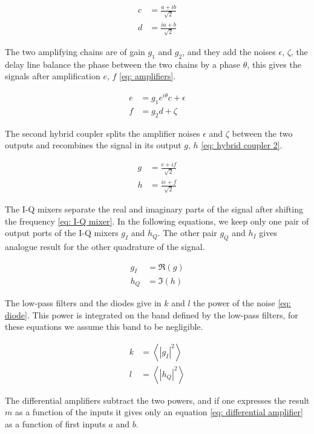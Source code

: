 \begin{align}
	c & =  \frac{a+ib}{\sqrt{2}} \\
	d & =  \frac{ia+b}{\sqrt{2}} \label{eq: hybrid coupler 1}
\end{align}

The two amplifying chains are of gain $g_{1}$ and $g_{2}$, and they add the noises $\epsilon$, $\zeta$, the delay line balance the phase between the two chains by a phase $\theta$, this gives the signals after amplification $e$, $f$ \eqref{eq: amplifiers}.

\begin{align}
	e & =  g_{1}e^{i\theta}c+\epsilon \\
	f & =  g_{2}d+\zeta \label{eq: amplifiers}
\end{align}

The second hybrid coupler splits the amplifier noises $\epsilon$ and $\zeta$ between the two outputs and recombines the signal in its output $g$, $h$ \eqref{eq: hybrid coupler 2}.

\begin{align}
	g & =  \frac{e+if}{\sqrt{2}} \\
	h & =  \frac{ie+f}{\sqrt{2}} \label{eq: hybrid coupler 2}
\end{align}

The I-Q mixers separate the real and imaginary parts of the signal after shifting the frequency \eqref{eq: I-Q mixer}.
In the following equations, we keep only one pair of output ports of the I-Q mixers $g_{I}$ and $h_{Q}$.
The other pair $g_{Q}$ and $h_{I}$ gives analogue result for the other quadrature of the signal.

\begin{align}
	g_{I} & = \Re\left(g\right) \\
	h_{Q} & = \Im\left(h\right) \label{eq: I-Q mixer}
\end{align}

The low-pass filters and the diodes give in $k$ and $l$ the power of the noise \eqref{eq: diode}.
This power is integrated on the band defined by the low-pass filters, for these equations we assume this band to be negligible.

\begin{align}
	k & = \left<\left|g_{I}\right|^{2}\right> \\
	l & = \left<\left|h_{Q}\right|^{2}\right> \label{eq: diode}
\end{align}

The differential amplifiers subtract the two powers, and if one expresses the result $m$ as a function of the inputs it gives only an equation \eqref{eq: differential amplifier} as a function of first inputs $a$ and $b$. 

